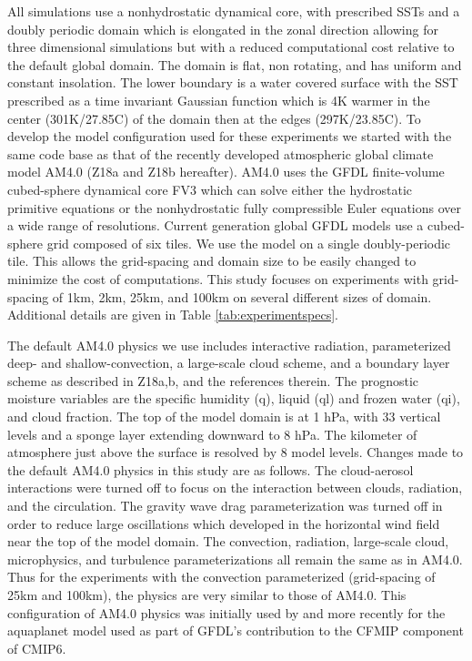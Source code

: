 \documentclass[draft]{agujournal2019}
\begin{document}
All simulations use a nonhydrostatic dynamical core, with prescribed SSTs and a doubly periodic domain which is elongated in the zonal 
direction allowing for three dimensional simulations but with a reduced computational cost relative to the default global domain.  
The domain is flat, non rotating, and has uniform and constant insolation.
The lower boundary is a water covered surface with the SST prescribed as a time invariant Gaussian function 
which is 4K warmer in the center (301K/27.85C) of the domain then 
at the edges (297K/23.85C).  
To develop the model configuration used for these experiments we started with the same code base as that of the 
recently developed atmospheric global climate model AM4.0 \cite{Zhao_etal18a, Zhao_etal18b} (Z18a and Z18b hereafter).
AM4.0 uses the GFDL finite-volume cubed-sphere dynamical core FV3 \cite{Harris_Lin_2013}
which can solve either the hydrostatic primitive equations or the nonhydrostatic fully compressible Euler equations over a wide range of resolutions.   
Current generation global GFDL models use a cubed-sphere grid composed of six tiles.  We use the model on a single doubly-periodic
tile.  This allows the grid-spacing and domain size to be easily changed to minimize the cost of computations.
This study focuses on experiments with grid-spacing of 1km, 2km, 25km, and 100km on several different
sizes of domain.  Additional details are given in Table \ref{tab:experimentspecs}.  

The default AM4.0 physics we use includes interactive radiation, parameterized deep- and shallow-convection, 
a large-scale cloud scheme, and a boundary layer 
scheme as described in Z18a,b, and the references therein.  The prognostic moisture variables are the specific 
humidity (q), liquid (ql) and frozen water (qi), and cloud fraction.  The top of the model domain is at 1 hPa, with 33 vertical 
levels and a sponge layer extending downward to 8 hPa.  The kilometer of atmosphere just above the surface is resolved by 
8 model levels.  Changes made to the default AM4.0 physics in this study are as follows.  The cloud-aerosol 
interactions were turned off to focus on the interaction between clouds, radiation, and the circulation.  The gravity wave drag 
parameterization was turned off 
in order to reduce large oscillations which developed in the horizontal wind field near the top of the model domain.  
The convection, radiation, large-scale cloud, microphysics, and turbulence parameterizations all remain the same 
as in AM4.0.   Thus for the experiments with the convection parameterized (grid-spacing of 25km and 100km), the 
physics are very similar to those of AM4.0.  
This configuration of AM4.0 physics was initially used by  and more recently for the aquaplanet model
used as part of GFDL's contribution to the CFMIP component of CMIP6.  
\end{document}
